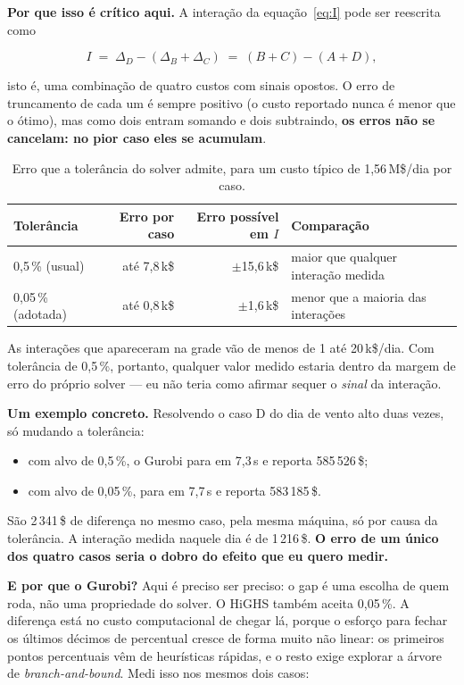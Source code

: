 \documentclass[11pt,a4paper]{article}
\begin{document}
\textbf{Por que isso é crítico aqui.} A interação da equação~\eqref{eq:I} pode ser reescrita como

\begin{equation}
I \;=\; \Delta_D - (\Delta_B + \Delta_C) \;=\; (B + C) - (A + D),
\end{equation}

isto é, uma combinação de quatro custos com sinais opostos. O erro de truncamento de cada um é sempre
positivo (o custo reportado nunca é menor que o ótimo), mas como dois entram somando e dois subtraindo,
\textbf{os erros não se cancelam: no pior caso eles se acumulam}.

\begin{table}[htbp]
\centering\small
\caption{Erro que a tolerância do solver admite, para um custo típico de 1{,}56\,M\$/dia por caso.}
\begin{tabular}{@{}lrrl@{}}
\toprule
Tolerância & Erro por caso & Erro possível em $I$ & Comparação \\
\midrule
0{,}5\,\% (usual) & até 7{,}8\,k\$ & $\pm$15{,}6\,k\$ & maior que qualquer interação medida \\
0{,}05\,\% (adotada) & até 0{,}8\,k\$ & $\pm$1{,}6\,k\$ & menor que a maioria das interações \\
\bottomrule
\end{tabular}
\end{table}

As interações que apareceram na grade vão de menos de 1 até 20\,k\$/dia. Com tolerância de 0{,}5\,\%, portanto,
qualquer valor medido estaria dentro da margem de erro do próprio solver --- eu não teria como afirmar
sequer o \emph{sinal} da interação.

\textbf{Um exemplo concreto.} Resolvendo o caso D do dia de vento alto duas vezes, só mudando a
tolerância:

\begin{itemize}
\item com alvo de 0{,}5\,\%, o Gurobi para em 7{,}3\,s e reporta 585\,526\,\$;
\item com alvo de 0{,}05\,\%, para em 7{,}7\,s e reporta 583\,185\,\$.
\end{itemize}

São 2\,341\,\$ de diferença no mesmo caso, pela mesma máquina, só por causa da tolerância. A interação
medida naquele dia é de 1\,216\,\$. \textbf{O erro de um único dos quatro casos seria o dobro do efeito
que eu quero medir.}

\textbf{E por que o Gurobi?} Aqui é preciso ser preciso: o gap é uma escolha de quem roda, não uma
propriedade do solver. O HiGHS também aceita 0{,}05\,\%. A diferença está no custo computacional de
chegar lá, porque o esforço para fechar os últimos décimos de percentual cresce de forma muito não
linear: os primeiros pontos percentuais vêm de heurísticas rápidas, e o resto exige explorar a árvore de
\emph{branch-and-bound}. Medi isso nos mesmos dois casos:
\end{document}
